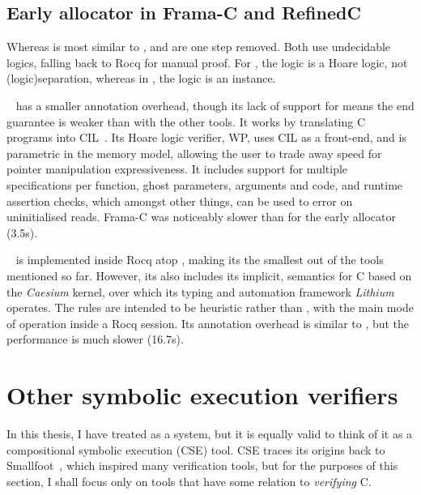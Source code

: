 \subsection{Early allocator in Frama-C and RefinedC}

Whereas  is most similar to ,  and
 are one step removed. Both use undecidable logics, falling back
to Rocq for manual proof. For , the logic is a Hoare logic,
not \kl(logic){separation}, whereas in , the logic is an  instance.

~\cite{pascal2012frama} has a smaller annotation overhead, though its lack of support for
 means the end guarantee is weaker than with the other tools.
It works by translating C programs into CIL~. Its Hoare
logic verifier, WP, uses CIL as a front-end, and is parametric in the
memory model, allowing the user to trade away speed for
pointer manipulation expressiveness. It includes support for multiple
specifications per function, ghost parameters, arguments and code, and runtime
assertion checks, which amongst other things, can be used to error on
uninitialised reads. Frama-C was noticeably slower than  for the
early allocator (3.5s).

~ is implemented inside Rocq atop , making its
 the smallest out of the tools mentioned
so far. However, its  also includes its implicit, \adhoc{} semantics for C
based on the \emph{Caesium} kernel, over which its typing and automation
framework \emph{Lithium} operates. The rules are intended to be heuristic
rather than , with the main mode of operation inside a Rocq
session. Its annotation overhead is similar to , but the performance is
much slower (16.7s).

\section{Other symbolic execution verifiers}

In this thesis, I have treated  as a  system, but it is
equally valid to think of it as a compositional symbolic execution (CSE) tool.
CSE traces its origins back to Smallfoot~, which
inspired many verification tools, but for the purposes of this section, I shall
focus only on tools that have some relation to \emph{verifying} C.

